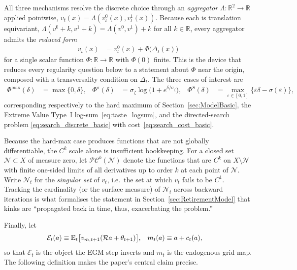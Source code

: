 All three mechanisms resolve the discrete choice through an \emph{aggregator}
$\Lambda:\mathbb{R}^2\to\mathbb{R}$ applied pointwise,
$v_t(x)=\Lambda(v_t^{0}(x),v_t^{1}(x))$. Because each is translation equivariant,
$\Lambda(v^0+k,v^1+k)=\Lambda(v^0,v^1)+k$ for all $k\in\mathbb{R}$, every aggregator
admits the \emph{reduced form}
\begin{align}
v_t(x) &= v_t^{0}(x) + \Phi\big(\Delta_t(x)\big)
\label{eq:reduced_form}
\end{align}
for a single scalar function $\Phi:\mathbb{R}\to\mathbb{R}$ with $\Phi(0)$ finite. This
is the device that reduces every regularity question below to a statement about $\Phi$
near the origin, composed with a transversality condition on $\Delta_t$. The three
cases of interest are
\begin{align}
\Phi^{\max}(\delta) &= \max\{0,\delta\},
&
\Phi^{\sigma}(\delta) &= \sigma_\zeta\log\!\big(1+e^{\delta/\sigma_\zeta}\big),
&
\Phi^{S}(\delta) &= \max_{\varepsilon\in[0,1]}\big\{\varepsilon\delta-\sigma(\varepsilon)\big\},
\label{eq:three_Phi}
\end{align}
corresponding respectively to the hard maximum of Section~\ref{sec:ModelBasic}, the
Extreme Value Type~I log-sum~\eqref{eq:taste_logsum}, and the directed-search problem
\eqref{eq:search_discrete_basic} with cost~\eqref{eq:search_cost_basic}.

Because the hard-max case produces functions that are not globally differentiable, the
$C^{k}$ scale alone is insufficient bookkeeping. For a closed set
$\mathcal{N}\subset X$ of measure zero, let $\mathcal{PC}^{k}(\mathcal{N})$ denote the
functions that are $C^{k}$ on $X\setminus\mathcal{N}$ with finite one-sided limits of
all derivatives up to order $k$ at each point of $\mathcal{N}$. Write
$\mathcal{N}_t$ for the \emph{singular set} of $v_t$, i.e.\ the set at which $v_t$
fails to be $C^1$. Tracking the cardinality (or the surface measure) of
$\mathcal{N}_t$ across backward iterations is what formalises the statement in
Section~\ref{sec:RetirementModel} that kinks are ``propagated back in time, thus,
exacerbating the problem.''

Finally, let
\begin{align}
\mathcal{E}_t(a) &\equiv \mathbb{E}_t\big[v_{m,t+1}(\mathcal{R}a+\theta_{t+1})\big],
&
m_t(a) &\equiv a + c_t(a),
\end{align}
so that $\mathcal{E}_t$ is the object the EGM step inverts and $m_t$ is the endogenous
grid map. The following definition makes the paper's central claim precise.

